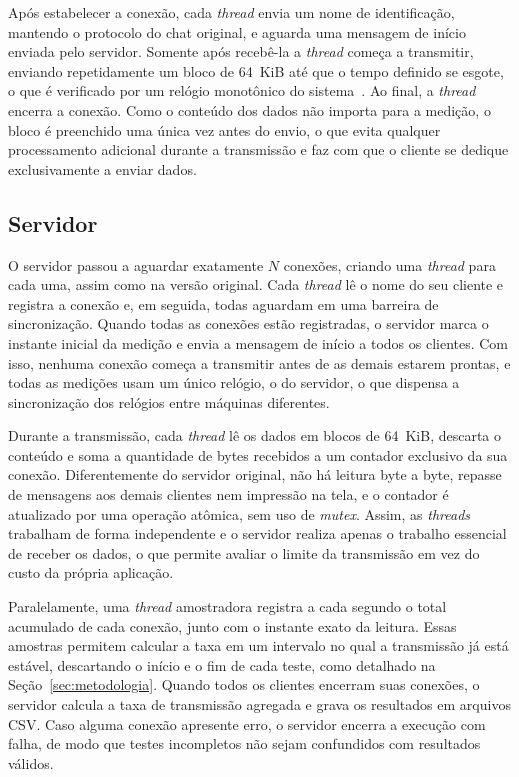 \documentclass[12pt]{article}
\begin{document}
Após estabelecer a conexão, cada \textit{thread} envia um nome de identificação,
mantendo o protocolo do chat original, e aguarda uma mensagem de início enviada
pelo servidor. Somente após recebê-la a \textit{thread} começa a transmitir,
enviando repetidamente um bloco de 64~KiB até que o tempo definido se esgote, o
que é verificado por um relógio monotônico do sistema~\cite{kerrisk:10}. Ao final, a
\textit{thread} encerra a conexão. Como o conteúdo dos dados não importa para a
medição, o bloco é preenchido uma única vez antes do envio, o que evita qualquer
processamento adicional durante a transmissão e faz com que o cliente se dedique
exclusivamente a enviar dados.

\subsection{Servidor}

O servidor passou a aguardar exatamente $N$ conexões, criando uma
\textit{thread} para cada uma, assim como na versão original. Cada
\textit{thread} lê o nome do seu cliente e registra a conexão e, em seguida,
todas aguardam em uma barreira de sincronização. Quando todas as conexões estão
registradas, o servidor marca o instante inicial da medição e envia a mensagem
de início a todos os clientes. Com isso, nenhuma conexão começa a transmitir
antes de as demais estarem prontas, e todas as medições usam um único relógio, o
do servidor, o que dispensa a sincronização dos relógios entre máquinas
diferentes.

Durante a transmissão, cada \textit{thread} lê os dados em blocos de 64~KiB,
descarta o conteúdo e soma a quantidade de bytes recebidos a um contador
exclusivo da sua conexão. Diferentemente do servidor original, não há leitura
byte a byte, repasse de mensagens aos demais clientes nem impressão na tela, e o
contador é atualizado por uma operação atômica, sem uso de \textit{mutex}.
Assim, as \textit{threads} trabalham de forma independente e o servidor realiza
apenas o trabalho essencial de receber os dados, o que permite avaliar o limite
da transmissão em vez do custo da própria aplicação.

Paralelamente, uma \textit{thread} amostradora registra a cada segundo o total
acumulado de cada conexão, junto com o instante exato da leitura. Essas amostras
permitem calcular a taxa em um intervalo no qual a transmissão já está estável,
descartando o início e o fim de cada teste, como detalhado na
Seção~\ref{sec:metodologia}. Quando todos os clientes encerram suas conexões, o
servidor calcula a taxa de transmissão agregada e grava os resultados em
arquivos CSV. Caso alguma conexão apresente erro, o servidor encerra a execução
com falha, de modo que testes incompletos não sejam confundidos com resultados
válidos.
\end{document}
